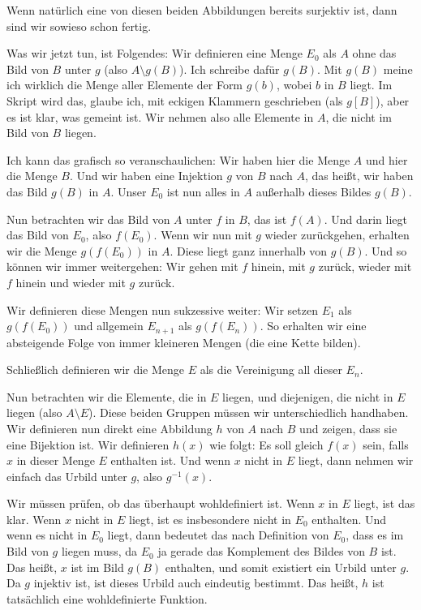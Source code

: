 \begin{spoken-clean}[00:24:22 - 00:26:00]
Wenn natürlich eine von diesen beiden Abbildungen bereits surjektiv ist, dann sind wir sowieso schon fertig. 

Was wir jetzt tun, ist Folgendes: Wir definieren eine Menge $E_0$ als $A$ ohne das Bild von $B$ unter $g$ (also $A \setminus g(B)$). Ich schreibe dafür $g(B)$. Mit $g(B)$ meine ich wirklich die Menge aller Elemente der Form $g(b)$, wobei $b$ in $B$ liegt. Im Skript wird das, glaube ich, mit eckigen Klammern geschrieben (als $g[B]$), aber es ist klar, was gemeint ist. Wir nehmen also alle Elemente in $A$, die nicht im Bild von $B$ liegen.

Ich kann das grafisch so veranschaulichen: Wir haben hier die Menge $A$ und hier die Menge $B$. Und wir haben eine Injektion $g$ von $B$ nach $A$, das heißt, wir haben das Bild $g(B)$ in $A$. Unser $E_0$ ist nun alles in $A$ außerhalb dieses Bildes $g(B)$.
\end{spoken-clean}

\begin{spoken-clean}[00:26:00 - 00:27:30]
Nun betrachten wir das Bild von $A$ unter $f$ in $B$, das ist $f(A)$. Und darin liegt das Bild von $E_0$, also $f(E_0)$. Wenn wir nun mit $g$ wieder zurückgehen, erhalten wir die Menge $g(f(E_0))$ in $A$. Diese liegt ganz innerhalb von $g(B)$. Und so können wir immer weitergehen: Wir gehen mit $f$ hinein, mit $g$ zurück, wieder mit $f$ hinein und wieder mit $g$ zurück.

Wir definieren diese Mengen nun sukzessive weiter: Wir setzen $E_1$ als $g(f(E_0))$ und allgemein $E_{n+1}$ als $g(f(E_n))$. So erhalten wir eine absteigende Folge von immer kleineren Mengen (die eine Kette bilden).

Schließlich definieren wir die Menge $E$ als die Vereinigung all dieser $E_n$.
\end{spoken-clean}

\begin{spoken-clean}[00:27:30 - 00:29:10]
Nun betrachten wir die Elemente, die in $E$ liegen, und diejenigen, die nicht in $E$ liegen (also $A \setminus E$). Diese beiden Gruppen müssen wir unterschiedlich handhaben. Wir definieren nun direkt eine Abbildung $h$ von $A$ nach $B$ und zeigen, dass sie eine Bijektion ist. Wir definieren $h(x)$ wie folgt: Es soll gleich $f(x)$ sein, falls $x$ in dieser Menge $E$ enthalten ist. Und wenn $x$ nicht in $E$ liegt, dann nehmen wir einfach das Urbild unter $g$, also $g^{-1}(x)$.

Wir müssen prüfen, ob das überhaupt wohldefiniert ist. Wenn $x$ in $E$ liegt, ist das klar. Wenn $x$ nicht in $E$ liegt, ist es insbesondere nicht in $E_0$ enthalten. Und wenn es nicht in $E_0$ liegt, dann bedeutet das nach Definition von $E_0$, dass es im Bild von $g$ liegen muss, da $E_0$ ja gerade das Komplement des Bildes von $B$ ist. Das heißt, $x$ ist im Bild $g(B)$ enthalten, und somit existiert ein Urbild unter $g$. Da $g$ injektiv ist, ist dieses Urbild auch eindeutig bestimmt. Das heißt, $h$ ist tatsächlich eine wohldefinierte Funktion.
\end{spoken-clean}

